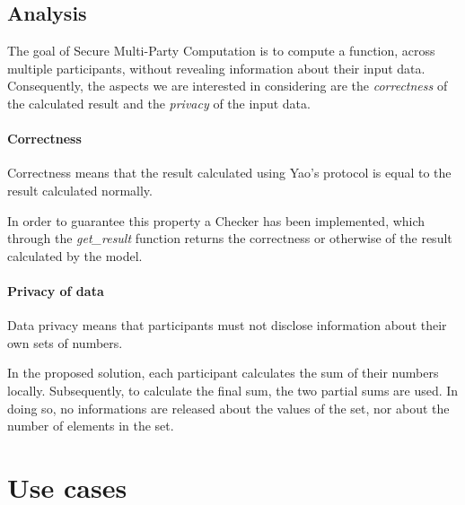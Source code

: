 \documentclass[12pt]{article}
\begin{document}
\subsection{Analysis}
The goal of Secure Multi-Party Computation is to compute a function, across multiple participants, without revealing information about their input data. Consequently, the aspects we are interested in considering are the \textit{correctness} of the calculated result and the \textit{privacy} of the input data.

\paragraph{Correctness}Correctness means that the result calculated using Yao's protocol is equal to the result calculated normally.

In order to guarantee this property a Checker has been implemented, which through the \textit{get\_result} function returns the correctness or otherwise of the result calculated by the model.

\paragraph{Privacy of data}Data privacy means that participants must not disclose information about their own sets of numbers.

In the proposed solution, each participant calculates the sum of their numbers locally. Subsequently, to calculate the final sum, the two partial sums are used. In doing so, no informations are released about the values of the set, nor about the number of elements in the set.

\section{Use cases}\label{use}
\end{document}
